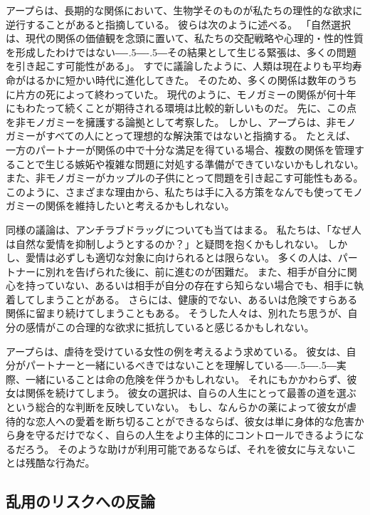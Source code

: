 \documentclass[paper=a4,book,openany]{jlreq}
\def\DDASH{―\kern-.5\zw―\kern-.5\zw―}
\begin{document}
アープらは、長期的な関係において、生物学そのものが私たちの理性的な欲求に逆行することがあると指摘している。
彼らは次のように述べる。
「自然選択は、現代の関係の価値観を念頭に置いて、私たちの交配戦略や心理的・性的性質を形成したわけではない{\DDASH}その結果として生じる緊張は、多くの問題を引き起こす可能性がある」\citep[p.567]{brian13:_natur_selec_child_ethic_marriag_divor}。
すでに議論したように、人類は現在よりも平均寿命がはるかに短かい時代に進化してきた。
そのため、多くの関係は数年のうちに片方の死によって終わっていた。
現代のように、モノガミーの関係が何十年にもわたって続くことが期待される環境は比較的新しいものだ。
先に、この点を非モノガミーを擁護する論拠として考察した。
しかし、アープらは、非モノガミーがすべての人にとって理想的な解決策ではないと指摘する。
たとえば、一方のパートナーが関係の中で十分な満足を得ている場合、複数の関係を管理することで生じる嫉妬や複雑な問題に対処する準備ができていないかもしれない。
また、非モノガミーがカップルの子供にとって問題を引き起こす可能性もある\citep[p.48]{earp20:_love_drugs}。
このように、さまざまな理由から、私たちは手に入る方策をなんでも使ってモノガミーの関係を維持したいと考えるかもしれない。

同様の議論は、アンチラブドラッグについても当てはまる。
私たちは、「なぜ人は自然な愛情を抑制しようとするのか？」と疑問を抱くかもしれない。
しかし、愛情は必ずしも適切な対象に向けられるとは限らない。
多くの人は、パートナーに別れを告げられた後に、前に進むのが困難だ。
また、相手が自分に関心を持っていない、あるいは相手が自分の存在すら知らない場合でも、相手に執着してしまうことがある。
さらには、健康的でない、あるいは危険ですらある関係に留まり続けてしまうこともある。
そうした人々は、別れたち思うが、自分の感情がこの合理的な欲求に抵抗していると感じるかもしれない。

アープらは、虐待を受けている女性の例を考えるよう求めている。
彼女は、自分がパートナーと一緒にいるべきではないことを理解している{\DDASH}実際、一緒にいることは命の危険を伴うかもしれない。
それにもかかわらず、彼女は関係を続けてしまう。
彼女の選択は、自らの人生にとって最善の道を選ぶという総合的な判断を反映していない。
もし、なんらかの薬によって彼女が虐待的な恋人への愛着を断ち切ることができるならば、彼女は単に身体的な危害から身を守るだけでなく、自らの人生をより主体的にコントロールできるようになるだろう。
そのような助けが利用可能であるならば、それを彼女に与えないことは残酷な行為だ。

\subsection{乱用のリスクへの反論}
\end{document}
